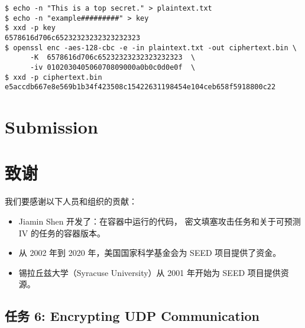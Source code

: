 \begin{lstlisting}
$ echo -n "This is a top secret." > plaintext.txt
$ echo -n "example#########" > key
$ xxd -p key
6578616d706c65232323232323232323
$ openssl enc -aes-128-cbc -e -in plaintext.txt -out ciphertext.bin \
      -K  6578616d706c65232323232323232323  \
      -iv 010203040506070809000a0b0c0d0e0f  \
$ xxd -p ciphertext.bin
e5accdb667e8e569b1b34f423508c15422631198454e104ceb658f5918800c22
\end{lstlisting}



\section{Submission}





\section{致谢}

我们要感谢以下人员和组织的贡献：

\begin{itemize}
\item Jiamin Shen 开发了：在容器中运行的代码，
      密文填塞攻击任务和关于可预测 IV 的任务的容器版本。

\item 从 2002 年到 2020 年，美国国家科学基金会为 SEED 项目提供了资金。

\item 锡拉丘兹大学（Syracuse University）从 2001 年开始为 SEED 项目提供资源。
\end{itemize}







\subsection{任务 6: Encrypting UDP Communication}

